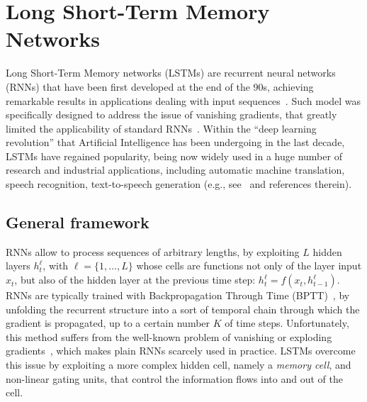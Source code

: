 \documentclass[journal]{IEEEtran}
\begin{document}
\section{Long Short-Term Memory Networks}
\label{sec:lstm}

Long Short-Term Memory networks (LSTMs) are recurrent neural networks (RNNs) that have been first developed at the end of the 90s, achieving remarkable results in applications dealing with input sequences~\cite{Hochreiter1997}. Such model was specifically designed to address the issue of vanishing gradients, that greatly limited the applicability of standard RNNs~\cite{Bengio1994}. Within the ``deep learning revolution'' that Artificial Intelligence has been undergoing in the last decade, LSTMs have regained popularity, being now widely used in a huge number of research and industrial applications, including automatic machine translation, speech recognition, text-to-speech generation (e.g., see~\cite{Greff2017} and references therein).

\subsection{General framework}

RNNs allow to process sequences of arbitrary lengths, by exploiting $L$ hidden layers $h_t^\ell$, with $\ell = \{1, \ldots, L\}$ whose cells are functions not only of the layer input $x_t$, but also of the hidden layer at the previous time step: $h_t^\ell = f(x_t, h_{t-1}^\ell)$. RNNs are typically trained with Backpropagation Through Time (BPTT)~\cite{Werbos1990}, by unfolding the recurrent structure into a sort of temporal chain through which the gradient is propagated, up to a certain number $K$ of time steps. Unfortunately, this method suffers from the well-known problem of vanishing or exploding gradients~\cite{Hochreiter1997,Bengio1994}, which makes plain RNNs scarcely used in practice. LSTMs overcome this issue by exploiting a more complex hidden cell, namely a \textit{memory cell}, and non-linear gating units, that control the information flows into and out of the cell.
\end{document}
